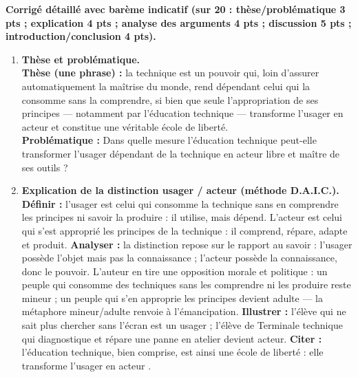 \documentclass[11pt]{article}
\begin{document}
\begin{exoresolu}
\textbf{Corrigé détaillé avec barème indicatif (sur 20 : thèse/problématique 3 pts ; explication 4 pts ; analyse des arguments 4 pts ; discussion 5 pts ; introduction/conclusion 4 pts).}

\begin{enumerate}
\item \textbf{Thèse et problématique.}\\
\textbf{Thèse (une phrase) :} la technique est un pouvoir qui, loin d'assurer automatiquement la maîtrise du monde, rend dépendant celui qui la consomme sans la comprendre, si bien que seule l'appropriation de ses principes — notamment par l'éducation technique — transforme l'usager en acteur et constitue une véritable école de liberté.\\
\textbf{Problématique :} Dans quelle mesure l'éducation technique peut-elle transformer l'usager dépendant de la technique en acteur libre et maître de ses outils ?

\item \textbf{Explication de la distinction \og usager \fg / \og acteur \fg (méthode D.A.I.C.).}\\
\textbf{Définir :} l'\og usager \fg est celui qui consomme la technique sans en comprendre les principes ni savoir la produire : il utilise, mais dépend. L'\og acteur \fg est celui qui s'est approprié les principes de la technique : il comprend, répare, adapte et produit. \textbf{Analyser :} la distinction repose sur le rapport au savoir : l'usager possède l'objet mais pas la connaissance ; l'acteur possède la connaissance, donc le pouvoir. L'auteur en tire une opposition morale et politique : \og un peuple qui consomme des techniques sans les comprendre ni les produire reste mineur ; un peuple qui s'en approprie les principes devient adulte \fg — la métaphore mineur/adulte renvoie à l'émancipation. \textbf{Illustrer :} l'élève qui ne sait plus chercher sans l'écran est un usager ; l'élève de Terminale technique qui diagnostique et répare une panne en atelier devient acteur. \textbf{Citer :} \og l'éducation technique, bien comprise, est ainsi une école de liberté : elle transforme l'usager en acteur \fg.


\end{enumerate}
\end{exoresolu}
\end{document}
